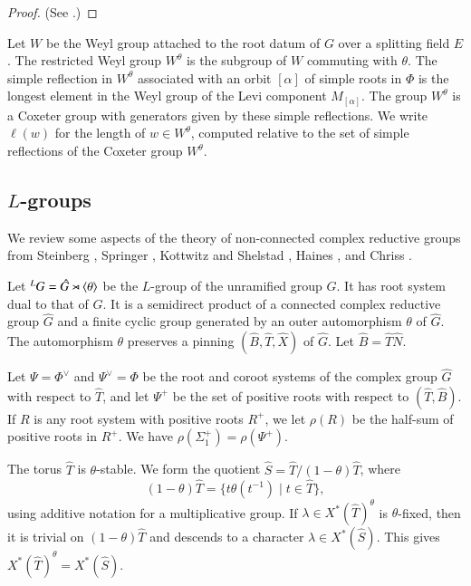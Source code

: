 \begin{proof}
(See \cite[1.3.9]{kottwitz1999foundations}.)
\end{proof}

Let $W$ be the
Weyl group attached to the root datum of $G$ over a splitting field $E$.
The restricted Weyl group $W^\theta$ is the subgroup of $W$
commuting with $\theta$.  The simple reflection in $W^\theta$ 
associated with an orbit $[\alpha]$ of simple roots in $\Phi$ is the
longest element in the Weyl group of the Levi component $M_{[\alpha]}$.
The group $W^\theta$
is a Coxeter group with generators given by these simple reflections.
We write $\ell(w)$ for the length of $w\in W^\theta$, computed relative to the set of simple reflections 
of the Coxeter group $W^\theta$.



\subsection{$L$-groups}


We review some aspects of the  theory of  non-connected complex reductive groups from
Steinberg \cite{steinberg1968endomorphisms},  Springer \cite{springer2010linear},
Kottwitz and Shelstad \cite{kottwitz1999foundations}, 
Haines \cite{haines2016dualities}, and
 Chriss \cite{chriss}.





Let ${}^LG = \hat G \rtimes \langle{\theta}\rangle$ be the $L$-group of the unramified group $G$.
It has root system dual to that of $G$.
It is a semidirect product of a connected complex reductive group $\hat G$ and a finite cyclic group
generated by an outer automorphism $\theta$ of $\hat G$.  The automorphism $\theta$ 
 preserves a pinning $(\hat B,\hat T,\hat X)$ of $\hat G$. Let $\hat B = \hat T\hat N$.

Let $\Psi=\Phi^\vee$ and $\Psi^\vee=\Phi$ be the root and coroot systems
 of the complex group $\hat G$ with respect to $\hat T$, and let
$\Psi^+$ be the set of positive roots with respect to $(\hat T,\hat B)$.
If $R$ is any root system with positive roots $R^+$, we let $\rho(R)$ be the half-sum
of positive roots in $R^+$.  We have $\rho(\Sigma^+_1) = \rho(\Psi^+)$.


The torus $\hat T$ is $\theta$-stable.  We form the quotient 
$\hat S = \hat T/(1-\theta) \hat T$, where
\[
(1-\theta)\hat T = \{ t\theta(t^{-1}) \mid t\in \hat T\},
\]
using additive notation for a multiplicative group.
If $\lambda\in X^*(\hat T)^\theta$ is $\theta$-fixed, then
it is trivial on $(1-\theta)\hat T$ and descends to a character $\lambda\in X^*(\hat S)$.
This gives $X^*(\hat T)^\theta = X^*(\hat S)$.

